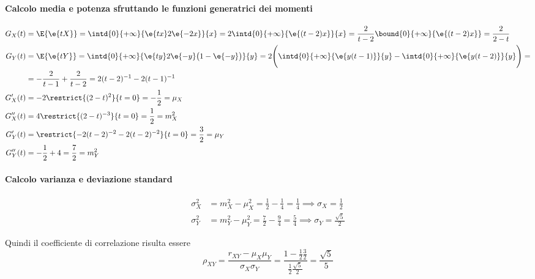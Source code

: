 \begin{esempio}
\paragraph{Calcolo media e potenza sfruttando le funzioni generatrici dei momenti}
\begin{align*}
	G_X (t) &= \E{\e{tX}} = \intd{0}{+\infty}{\e{tx} 2 \e{-2x}}{x} = 2\intd{0}{+\infty}{\e{(t-2)x}}{x} = \frac{2}{t-2} \bound{0}{+\infty}{\e{(t-2)x}} = \frac{2}{2-t} \\
	G_Y (t) &= \E{\e{tY}} = \intd{0}{+\infty}{\e{ty} 2 \e{-y} \bigl(1 - \e{-y}\bigr)}{y} = 2\Biggl( \intd{0}{+\infty}{\e{y(t-1)}}{y} - \intd{0}{+\infty}{\e{y(t-2)}}{y} \Biggr) = \\
		&= -\frac{2}{t-1} + \frac{2}{t-2} = 2(t-2)^{-1} -2(t-1)^{-1} \\
	G'_X(t) &= -2\restrict{(2-t)^2}{t=0} = -\frac{1}{2} = \mu_X \\
	G''_X(t)&= 4\restrict{(2-t)^{-3}}{t=0} = \frac{1}{2} = m^2_X \\
	G'_Y(t) &= \restrict{-2(t-2)^{-2} - 2(t-2)^{-2}}{t=0} = \frac{3}{2} = \mu_Y \\
	G''_Y(t)&= -\frac{1}{2} + 4 = \frac{7}{2} = m^2_Y
\end{align*}

\paragraph{Calcolo varianza e deviazione standard}
\begin{align*}
	\sigma^2_X &= m^2_X - \mu^2_X = \frac{1}{2} - \frac{1}{4} = \frac{1}{4} \implies \sigma_X = \frac{1}{2} \\
	\sigma^2_Y &= m^2_Y - \mu^2_Y = \frac{7}{2} - \frac{9}{4} = \frac{5}{4} \implies \sigma_Y = \frac{\sqrt{5}}{2}
\end{align*}

Quindi il coefficiente di correlazione risulta essere
\[
	\rho_{XY}=\frac{r_{XY}-\mu_X \mu_Y}{\sigma_X \sigma_Y} =
	\frac{1-\frac{1}{2} \frac{3}{2}}{\frac{1}{2}\frac{\sqrt{5}}{2}} =\frac{\sqrt{5}}{5}
\]
\end{esempio}

